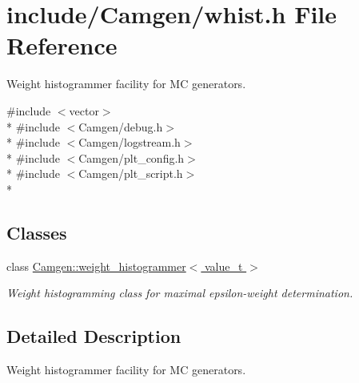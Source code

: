 \hypertarget{a00848}{}\section{include/\+Camgen/whist.h File Reference}
\label{a00848}


Weight histogrammer facility for M\+C generators.  


{\ttfamily \#include $<$vector$>$}\\*
{\ttfamily \#include $<$Camgen/debug.\+h$>$}\\*
{\ttfamily \#include $<$Camgen/logstream.\+h$>$}\\*
{\ttfamily \#include $<$Camgen/plt\+\_\+config.\+h$>$}\\*
{\ttfamily \#include $<$Camgen/plt\+\_\+script.\+h$>$}\\*
\subsection*{Classes}
\begin{DoxyCompactItemize}
\item 
class \hyperlink{a00596}{Camgen\+::weight\+\_\+histogrammer$<$ value\+\_\+t $>$}
\begin{DoxyCompactList}\small\item\em Weight histogramming class for maximal epsilon-\/weight determination. \end{DoxyCompactList}\end{DoxyCompactItemize}


\subsection{Detailed Description}
Weight histogrammer facility for M\+C generators. 

